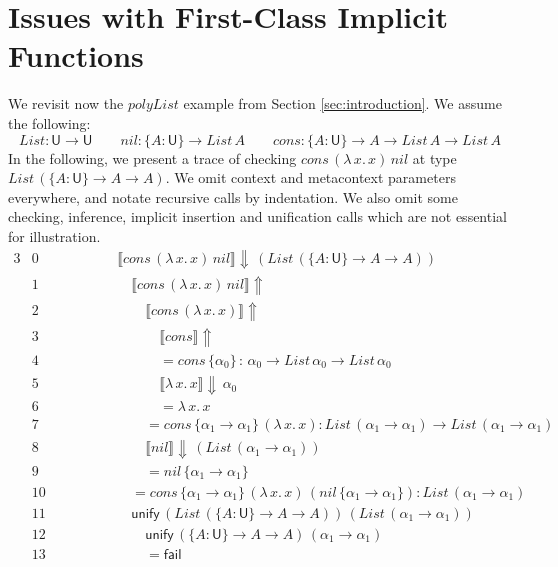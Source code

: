\documentclass[acmsmall,review,anonymous,prologue,dvipsnames]{acmart}\settopmatter{printfolios=true,printccs=false,printacmref=false}
\renewcommand{\U}{\mathsf{U}}
\newcommand{\unify}{\mathsf{unify}}
\newcommand{\fail}{\mathsf{fail}}
\newcommand{\echeckt}[2]{\llbracket#1\rrbracket\!\Downarrow\,#2}
\newcommand{\einfert}[1]{\llbracket#1\rrbracket\!\Uparrow}
\theoremstyle{remark}
\begin{document}
\section{Issues with First-Class Implicit Functions}
\label{sec:issues}

We revisit now the $polyList$ example from Section \ref{sec:introduction}. We
assume the following:
\[
List : \U \to \U \qquad nil : \{A : \U\} \to List\,A \qquad
cons : \{A : \U\} \to A \to List\,A \to List\,A
\]
In the following, we present a trace of checking $cons\,(\lambda\,x.\,x)\,nil$
at type $List\,(\{A : \U\}\to A \to A)$. We omit context and metacontext
parameters everywhere, and notate recursive calls by indentation. We also omit
some checking, inference, implicit insertion and unification calls which are not
essential for illustration.
\begin{alignat*}{3}
  & \scriptstyle{0 }\qquad\qquad && \echeckt{cons\,(\lambda\,x.\,x)\,nil}{(List\,(\{A : \U\}\to A \to A))}
     \hspace{14em}\\
  & \scriptstyle{1 }  && \quad \einfert{cons\,(\lambda\,x.\,x)\,nil} \\
  & \scriptstyle{2 }  && \qquad \einfert{cons\,(\lambda\,x.\,x)}\\
  & \scriptstyle{3 }  && \qquad\quad \einfert{cons}\\
  & \scriptstyle{4 }  && \qquad\quad = cons\,\{\alpha_0\}\,:\,\alpha_0 \to List\,\alpha_0 \to List\,\alpha_0\\
  & \scriptstyle{5 }  && \qquad\quad \echeckt{\lambda\,x.\,x}{\alpha_0}\\
  & \scriptstyle{6 }  && \qquad\quad = \lambda\,x.\,x\\
  & \scriptstyle{7 }  && \qquad = cons\,\{\alpha_1 \to \alpha_1\}\,(\lambda\,x.\,x) : List\,(\alpha_1\to\alpha_1) \to List\,(\alpha_1\to\alpha_1)\\
  & \scriptstyle{8 }  && \qquad \echeckt{nil}{(List\,(\alpha_1\to\alpha_1))}\\
  & \scriptstyle{9 }  && \qquad = nil\,\{\alpha_1\to\alpha_1\}\\
  & \scriptstyle{10} && \quad = cons\,\{\alpha_1 \to \alpha_1\}\,(\lambda\,x.\,x)\,(nil\,\{\alpha_1\to\alpha_1\}): List\,(\alpha_1\to\alpha_1)\\
  & \scriptstyle{11} && \quad \unify\,(List\,(\{A : \U\}\to A \to A))\,(List\,(\alpha_1\to\alpha_1))\\
  & \scriptstyle{12} && \qquad \unify\,(\{A : \U\}\to A \to A)\,(\alpha_1\to\alpha_1)\\
  & \scriptstyle{13} && \qquad = \fail
\end{alignat*}
\end{document}

